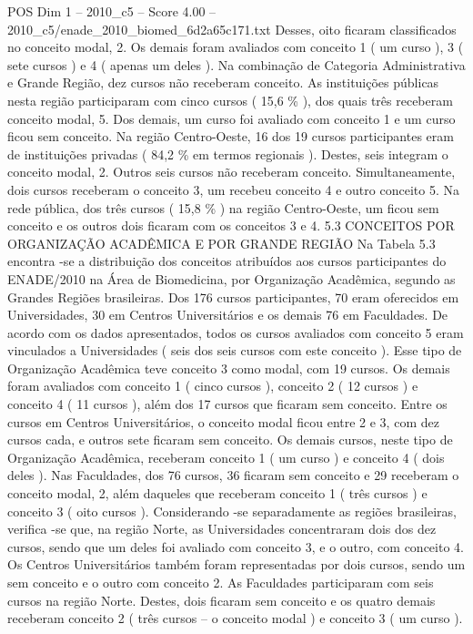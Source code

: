 \begin{textsample}{POS Dim 1 – 2010\_c5 – Score 4.00 – 2010\_c5/enade\_2010\_biomed\_6d2a65c171.txt}
Desses, oito ficaram classificados no conceito modal, 2.
Os demais foram avaliados com conceito 1 ( um curso ), 3 ( sete cursos ) e 4 ( apenas um deles ).
Na combinação de Categoria Administrativa e Grande Região, dez cursos não receberam conceito.
As instituições públicas nesta região participaram com cinco cursos ( 15,6 \% ), dos quais três receberam conceito modal, 5.
Dos demais, um curso foi avaliado com conceito 1 e um curso ficou sem conceito.
Na região Centro-Oeste, 16 dos 19 cursos participantes eram de instituições privadas ( 84,2 \% em termos regionais ).
Destes, seis integram o conceito modal, 2.
Outros seis cursos não receberam conceito.
Simultaneamente, dois cursos receberam o conceito 3, um recebeu conceito 4 e outro conceito 5.
Na rede pública, dos três cursos ( 15,8 \% ) na região Centro-Oeste, um ficou sem conceito e os outros dois ficaram com os conceitos 3 e 4. 5.3 CONCEITOS POR ORGANIZAÇÃO ACADÊMICA E POR GRANDE REGIÃO Na Tabela 5.3 encontra -se a distribuição dos conceitos atribuídos aos cursos participantes do ENADE/2010 na Área de Biomedicina, por Organização Acadêmica, segundo as Grandes Regiões brasileiras.
Dos 176 cursos participantes, 70 eram oferecidos em Universidades, 30 em Centros Universitários e os demais 76 em Faculdades.
De acordo com os dados apresentados, todos os cursos avaliados com conceito 5 eram vinculados a Universidades ( seis dos seis cursos com este conceito ).
Esse tipo de Organização Acadêmica teve conceito 3 como modal, com 19 cursos.
Os demais foram avaliados com conceito 1 ( cinco cursos ), conceito 2 ( 12 cursos ) e conceito 4 ( 11 cursos ), além dos 17 cursos que ficaram sem conceito.
Entre os cursos em Centros Universitários, o conceito modal ficou entre 2 e 3, com dez cursos cada, e outros sete ficaram sem conceito.
Os demais cursos, neste tipo de Organização Acadêmica, receberam conceito 1 ( um curso ) e conceito 4 ( dois deles ).
Nas Faculdades, dos 76 cursos, 36 ficaram sem conceito e 29 receberam o conceito modal, 2, além daqueles que receberam conceito 1 ( três cursos ) e conceito 3 ( oito cursos ).
Considerando -se separadamente as regiões brasileiras, verifica -se que, na região Norte, as Universidades concentraram dois dos dez cursos, sendo que um deles foi avaliado com conceito 3, e o outro, com conceito 4.
Os Centros Universitários também foram representadas por dois cursos, sendo um sem conceito e o outro com conceito 2.
As Faculdades participaram com seis cursos na região Norte.
Destes, dois ficaram sem conceito e os quatro demais receberam conceito 2 ( três cursos – o conceito modal ) e conceito 3 ( um curso ).

\end{textsample}
